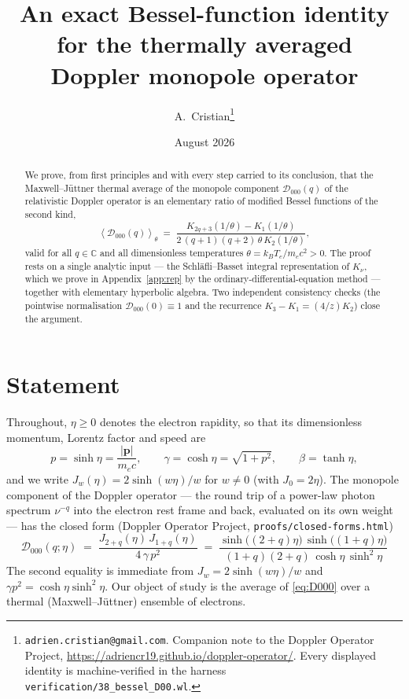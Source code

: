 \documentclass[11pt]{article}
\title{An exact Bessel-function identity for the thermally averaged\\ Doppler monopole operator}
\author{A.~Cristian\thanks{\texttt{adrien.cristian@gmail.com}. Companion note to the Doppler Operator Project,
\url{https://adriencr19.github.io/doppler-operator/}. Every displayed identity is machine-verified in the
harness \texttt{verification/38\_bessel\_D00.wl}.}}
\date{August 2026}
\theoremstyle{definition}
\theoremstyle{remark}
\newcommand{\Do}{\mathcal{D}}
\newcommand{\avg}[1]{\left\langle #1 \right\rangle}
\newcommand{\Cx}{\mathbb{C}}
\begin{document}
\maketitle

\begin{abstract}
We prove, from first principles and with every step carried to its conclusion, that the Maxwell--J\"uttner
thermal average of the monopole component $\Do_{000}(q)$ of the relativistic Doppler operator is an elementary
ratio of modified Bessel functions of the second kind,
\[
  \avg{\Do_{000}(q)}_\theta
  \;=\;
  \frac{K_{2q+3}(1/\theta)-K_{1}(1/\theta)}{2\,(q+1)(q+2)\,\theta\,K_{2}(1/\theta)} ,
\]
valid for all $q\in\Cx$ and all dimensionless temperatures $\theta=k_BT_e/m_ec^2>0$. The proof rests on a single
analytic input --- the Schl\"afli--Basset integral representation of $K_\nu$, which we prove in
Appendix~\ref{app:rep} by the ordinary-differential-equation method --- together with elementary hyperbolic
algebra. Two independent consistency checks (the pointwise normalisation $\Do_{000}(0)\equiv1$ and the recurrence
$K_{3}-K_{1}=(4/z)K_2$) close the argument.
\end{abstract}

\section{Statement}
\label{sec:statement}

Throughout, $\eta\ge 0$ denotes the electron rapidity, so that its dimensionless momentum, Lorentz factor and
speed are
\begin{equation}
  p=\sinh\eta=\frac{|\bm p|}{m_ec},\qquad
  \gamma=\cosh\eta=\sqrt{1+p^2},\qquad
  \beta=\tanh\eta,
  \label{eq:rapidity}
\end{equation}
and we write $J_w(\eta)=2\sinh(w\eta)/w$ for $w\neq0$ (with $J_0=2\eta$). The monopole component of the Doppler
operator --- the round trip of a power-law photon spectrum $\nu^{-q}$ into the electron rest frame and back,
evaluated on its own weight --- has the closed form (Doppler Operator Project, \texttt{proofs/closed-forms.html})
\begin{equation}
  \boxed{\;
  \Do_{000}(q;\eta)
  \;=\;
  \frac{J_{2+q}(\eta)\,J_{1+q}(\eta)}{4\,\gamma\,p^{2}}
  \;=\;
  \frac{\sinh\!\big((2+q)\eta\big)\,\sinh\!\big((1+q)\eta\big)}{(1+q)(2+q)\,\cosh\eta\,\sinh^{2}\eta}\; }
  \label{eq:D000}
\end{equation}
The second equality is immediate from $J_w=2\sinh(w\eta)/w$ and $\gamma p^2=\cosh\eta\sinh^2\eta$. Our object of
study is the average of \eqref{eq:D000} over a thermal (Maxwell--J\"uttner) ensemble of electrons.
\end{document}
